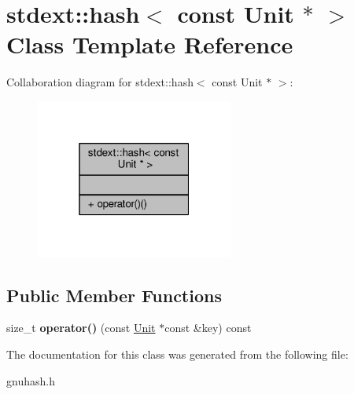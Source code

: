 \hypertarget{classstdext_1_1hash_3_01const_01Unit_01_5_01_4}{}\section{stdext\+:\+:hash$<$ const Unit $\ast$ $>$ Class Template Reference}
\label{classstdext_1_1hash_3_01const_01Unit_01_5_01_4}


Collaboration diagram for stdext\+:\+:hash$<$ const Unit $\ast$ $>$\+:
\nopagebreak
\begin{figure}[H]
\begin{center}
\leavevmode
\includegraphics[width=184pt]{dc/de1/classstdext_1_1hash_3_01const_01Unit_01_5_01_4__coll__graph}
\end{center}
\end{figure}
\subsection*{Public Member Functions}
\begin{DoxyCompactItemize}
\item 
size\+\_\+t {\bfseries operator()} (const \hyperlink{classUnit}{Unit} $\ast$const \&key) const \hypertarget{classstdext_1_1hash_3_01const_01Unit_01_5_01_4_a7a3b51583d76bafdb64171d25e625195}{}\label{classstdext_1_1hash_3_01const_01Unit_01_5_01_4_a7a3b51583d76bafdb64171d25e625195}

\end{DoxyCompactItemize}


The documentation for this class was generated from the following file\+:\begin{DoxyCompactItemize}
\item 
gnuhash.\+h\end{DoxyCompactItemize}
